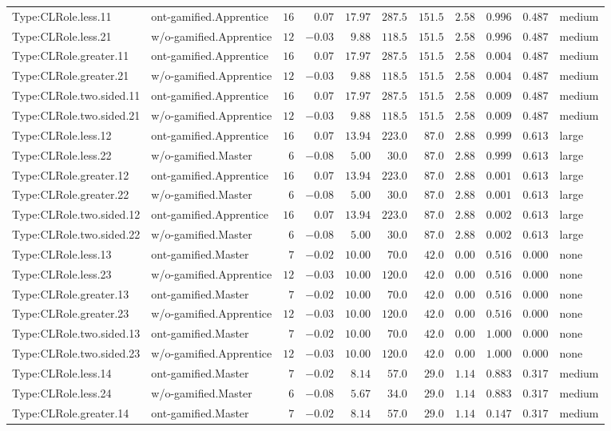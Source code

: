 \documentclass[6pt,a4paper]{article}
\begin{document}
{\begin{longtable}{llrrrrrrrrl}
Type:CLRole.less.11&ont-gamified.Apprentice&$16$&$ 0.07$&$17.97$&$287.5$&$151.5$&$2.58$&$0.996$&$0.487$&medium\tabularnewline
Type:CLRole.less.21&w/o-gamified.Apprentice&$12$&$-0.03$&$ 9.88$&$118.5$&$151.5$&$2.58$&$0.996$&$0.487$&medium\tabularnewline
Type:CLRole.greater.11&ont-gamified.Apprentice&$16$&$ 0.07$&$17.97$&$287.5$&$151.5$&$2.58$&$0.004$&$0.487$&medium\tabularnewline
Type:CLRole.greater.21&w/o-gamified.Apprentice&$12$&$-0.03$&$ 9.88$&$118.5$&$151.5$&$2.58$&$0.004$&$0.487$&medium\tabularnewline
Type:CLRole.two.sided.11&ont-gamified.Apprentice&$16$&$ 0.07$&$17.97$&$287.5$&$151.5$&$2.58$&$0.009$&$0.487$&medium\tabularnewline
Type:CLRole.two.sided.21&w/o-gamified.Apprentice&$12$&$-0.03$&$ 9.88$&$118.5$&$151.5$&$2.58$&$0.009$&$0.487$&medium\tabularnewline
Type:CLRole.less.12&ont-gamified.Apprentice&$16$&$ 0.07$&$13.94$&$223.0$&$ 87.0$&$2.88$&$0.999$&$0.613$&large\tabularnewline
Type:CLRole.less.22&w/o-gamified.Master&$ 6$&$-0.08$&$ 5.00$&$ 30.0$&$ 87.0$&$2.88$&$0.999$&$0.613$&large\tabularnewline
Type:CLRole.greater.12&ont-gamified.Apprentice&$16$&$ 0.07$&$13.94$&$223.0$&$ 87.0$&$2.88$&$0.001$&$0.613$&large\tabularnewline
Type:CLRole.greater.22&w/o-gamified.Master&$ 6$&$-0.08$&$ 5.00$&$ 30.0$&$ 87.0$&$2.88$&$0.001$&$0.613$&large\tabularnewline
Type:CLRole.two.sided.12&ont-gamified.Apprentice&$16$&$ 0.07$&$13.94$&$223.0$&$ 87.0$&$2.88$&$0.002$&$0.613$&large\tabularnewline
Type:CLRole.two.sided.22&w/o-gamified.Master&$ 6$&$-0.08$&$ 5.00$&$ 30.0$&$ 87.0$&$2.88$&$0.002$&$0.613$&large\tabularnewline
Type:CLRole.less.13&ont-gamified.Master&$ 7$&$-0.02$&$10.00$&$ 70.0$&$ 42.0$&$0.00$&$0.516$&$0.000$&none\tabularnewline
Type:CLRole.less.23&w/o-gamified.Apprentice&$12$&$-0.03$&$10.00$&$120.0$&$ 42.0$&$0.00$&$0.516$&$0.000$&none\tabularnewline
Type:CLRole.greater.13&ont-gamified.Master&$ 7$&$-0.02$&$10.00$&$ 70.0$&$ 42.0$&$0.00$&$0.516$&$0.000$&none\tabularnewline
Type:CLRole.greater.23&w/o-gamified.Apprentice&$12$&$-0.03$&$10.00$&$120.0$&$ 42.0$&$0.00$&$0.516$&$0.000$&none\tabularnewline
Type:CLRole.two.sided.13&ont-gamified.Master&$ 7$&$-0.02$&$10.00$&$ 70.0$&$ 42.0$&$0.00$&$1.000$&$0.000$&none\tabularnewline
Type:CLRole.two.sided.23&w/o-gamified.Apprentice&$12$&$-0.03$&$10.00$&$120.0$&$ 42.0$&$0.00$&$1.000$&$0.000$&none\tabularnewline
Type:CLRole.less.14&ont-gamified.Master&$ 7$&$-0.02$&$ 8.14$&$ 57.0$&$ 29.0$&$1.14$&$0.883$&$0.317$&medium\tabularnewline
Type:CLRole.less.24&w/o-gamified.Master&$ 6$&$-0.08$&$ 5.67$&$ 34.0$&$ 29.0$&$1.14$&$0.883$&$0.317$&medium\tabularnewline
Type:CLRole.greater.14&ont-gamified.Master&$ 7$&$-0.02$&$ 8.14$&$ 57.0$&$ 29.0$&$1.14$&$0.147$&$0.317$&medium\tabularnewline

\end{longtable}}
\end{document}
